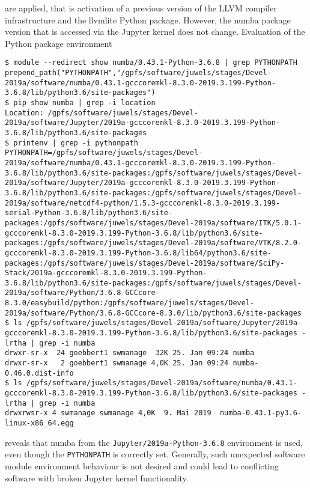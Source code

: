 \documentclass[11pt,a4paper]{article}
\begin{document}
are applied, that is activation of a previous version of the LLVM compiler infrastructure and the llvmlite Python package.
However, the numba package version that is accessed via the Jupyter kernel does not change.
Evaluation of the Python package environment

\begin{verbatim}
$ module --redirect show numba/0.43.1-Python-3.6.8 | grep PYTHONPATH
prepend_path("PYTHONPATH","/gpfs/software/juwels/stages/Devel-2019a/software/numba/0.43.1-gcccoremkl-8.3.0-2019.3.199-Python-3.6.8/lib/python3.6/site-packages")
$ pip show numba | grep -i location
Location: /gpfs/software/juwels/stages/Devel-2019a/software/Jupyter/2019a-gcccoremkl-8.3.0-2019.3.199-Python-3.6.8/lib/python3.6/site-packages
$ printenv | grep -i pythonpath
PYTHONPATH=/gpfs/software/juwels/stages/Devel-2019a/software/numba/0.43.1-gcccoremkl-8.3.0-2019.3.199-Python-3.6.8/lib/python3.6/site-packages:/gpfs/software/juwels/stages/Devel-2019a/software/Jupyter/2019a-gcccoremkl-8.3.0-2019.3.199-Python-3.6.8/lib/python3.6/site-packages:/gpfs/software/juwels/stages/Devel-2019a/software/netcdf4-python/1.5.3-gcccoremkl-8.3.0-2019.3.199-serial-Python-3.6.8/lib/python3.6/site-packages:/gpfs/software/juwels/stages/Devel-2019a/software/ITK/5.0.1-gcccoremkl-8.3.0-2019.3.199-Python-3.6.8/lib/python3.6/site-packages:/gpfs/software/juwels/stages/Devel-2019a/software/VTK/8.2.0-gcccoremkl-8.3.0-2019.3.199-Python-3.6.8/lib64/python3.6/site-packages:/gpfs/software/juwels/stages/Devel-2019a/software/SciPy-Stack/2019a-gcccoremkl-8.3.0-2019.3.199-Python-3.6.8/lib/python3.6/site-packages:/gpfs/software/juwels/stages/Devel-2019a/software/Python/3.6.8-GCCcore-8.3.0/easybuild/python:/gpfs/software/juwels/stages/Devel-2019a/software/Python/3.6.8-GCCcore-8.3.0/lib/python3.6/site-packages
$ ls /gpfs/software/juwels/stages/Devel-2019a/software/Jupyter/2019a-gcccoremkl-8.3.0-2019.3.199-Python-3.6.8/lib/python3.6/site-packages -lrtha | grep -i numba
drwxr-sr-x  24 goebbert1 swmanage  32K 25. Jan 09:24 numba
drwxr-sr-x   2 goebbert1 swmanage 4,0K 25. Jan 09:24 numba-0.46.0.dist-info
$ ls /gpfs/software/juwels/stages/Devel-2019a/software/numba/0.43.1-gcccoremkl-8.3.0-2019.3.199-Python-3.6.8/lib/python3.6/site-packages -lrtha | grep -i numba
drwxrwsr-x 4 swmanage swmanage 4,0K  9. Mai 2019  numba-0.43.1-py3.6-linux-x86_64.egg
\end{verbatim}

reveals that numba from the \verb|Jupyter/2019a-Python-3.6.8| environment is used, even though the \verb|PYTHONPATH| is correctly set.
Generally, such unexpected software module environment behaviour is not desired and could lead to conflicting software with broken Jupyter kernel functionality.
\end{document}
